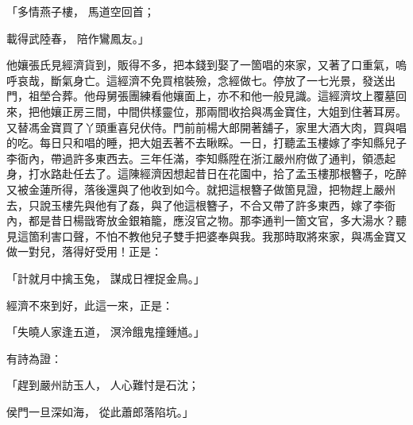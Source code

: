 「多情燕子樓，  馬道空回首；

載得武陸春，  陪作鸞鳳友。」

他孃張氏見經濟貨到，販得不多，把本錢到娶了一箇唱的來家，又著了口重氣，嗚呼哀哉，斷氣身亡。這經濟不免買棺裝殮，念經做七。停放了一七光景，發送出門，祖塋合葬。他母舅張團練看他孃面上，亦不和他一般見識。這經濟坟上覆墓回來，把他孃正房三間，中間供樣靈位，那兩間收拾與馮金寶住，大姐到住著耳房。又替馮金寶買了丫頭重喜兒伏侍。門前前楊大郎開著舖子，家里大酒大肉，買與唱的吃。每日只和唱的睡，把大姐丟著不去瞅睬。一日，打聽孟玉樓嫁了李知縣兒子李衙內，帶過許多東西去。三年任滿，李知縣陞在浙江嚴州府做了通判，領憑起身，打水路赴任去了。這陳經濟因想起昔日在花園中，拾了孟玉樓那根簪子，吃醉又被金蓮所得，落後還與了他收到如今。就把這根簪子做箇見證，把物趕上嚴州去，只說玉樓先與他有了姦，與了他這根簪子，不合又帶了許多東西，嫁了李衙內，都是昔日楊戩寄放金銀箱籠，應沒官之物。那李通判一箇文官，多大湯水？聽見這箇利害口聲，不怕不教他兒子雙手把婆奉與我。我那時取將來家，與馮金寶又做一對兒，落得好受用！正是：

「計就月中擒玉兔，  謀成日裡捉金鳥。」

經濟不來到好，此這一來，正是：

「失曉人家逢五道，  溟泠餓鬼撞鍾馗。」

有詩為證：

「趕到嚴州訪玉人，  人心難忖是石沈；

侯門一旦深如海，  從此蕭郎落陷坑。」

